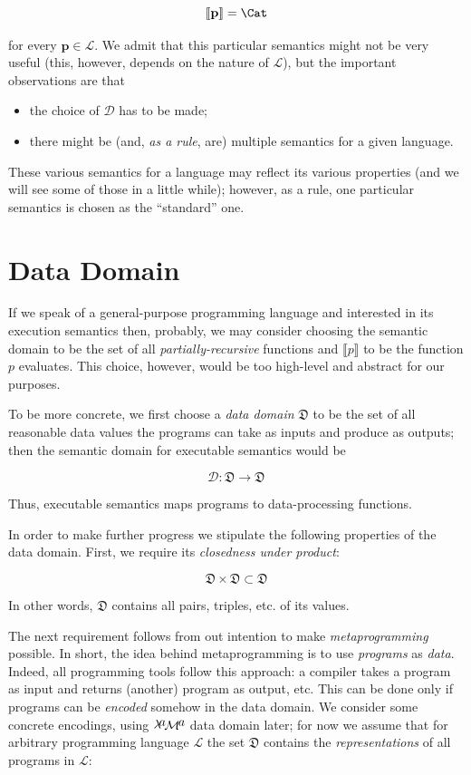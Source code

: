 \documentclass{book}
\newcommand{\sembr}[1]{\llbracket{#1}\rrbracket}
\newcommand{\primi}[1]{\mathbf{#1}}
\newcommand{\lama}{$\lambda\kern -.1667em\lower -.5ex\hbox{$a$}\kern -.1000em\lower .2ex\hbox{$\mathcal M$}\kern -.1000em\lower -.5ex\hbox{$a$}$\xspace}
\begin{document}
\[
\sembr{\primi{p}}=\Cat
\]

for every $\primi{p}\in\mathcal L$. We admit that this particular
semantics might not be very useful (this, however, depends on the nature of $\mathcal L$), but the important observations are that

\begin{itemize}
\item the choice of $\mathcal D$ has to be made;
\item there might be (and, \emph{as a rule}, are) multiple semantics for a given language.
\end{itemize}

These various semantics for a language may reflect its various properties (and we will see some of those in a little while); however, as a rule, one particular
semantics is chosen as the ``standard'' one.

\section{Data Domain}

If we speak of a general-purpose programming language and interested in its execution semantics then, probably, we may consider choosing the semantic domain
to be the set of all \emph{partially-recursive} functions and $\sembr{p}$ to be the function $p$ evaluates. This choice, however, would be too high-level and
abstract for our purposes.

To be more concrete, we first choose a \emph{data domain} $\mathfrak D$ to be the set of all reasonable data values the programs can take as inputs and
produce as outputs; then the semantic domain for executable semantics would be

\[
\mathcal{D}:\mathfrak{D}\to\mathfrak{D}
\]

Thus, executable semantics maps programs to data-processing functions.

In order to make further progress we stipulate the following properties of the data domain. First, we require its \emph{closedness under product}:

\[
\mathfrak{D}\times\mathfrak{D}\subset\mathfrak{D}
\]

In other words, $\mathfrak{D}$ contains all pairs, triples, etc. of its values.

The next requirement follows from out intention to make \emph{metaprogramming} possible. In short, the idea behind metaprogramming is
to use \emph{programs} as \emph{data}. Indeed, all programming tools follow this approach: a compiler takes a program as input and
returns (another) program as output, etc. This can be done only if programs can be \emph{encoded} somehow in the data domain. We
consider some concrete encodings, using \lama data domain later; for now we assume that for arbitrary programming language $\mathcal{L}$
the set $\mathfrak{D}$ contains the \emph{representations}
of all programs in $\mathcal{L}$:
\end{document}

